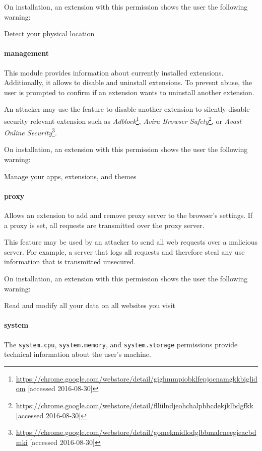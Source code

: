 	On installation, an extension with this permission shows the user the following warning:
	\begin{permissionwarning}
		Detect your physical location 
	\end{permissionwarning}
	
\paragraph{management}
	This module provides information about currently installed extensions. Additionally, it allows to disable and uninstall extensions. To prevent abuse, the user is prompted to confirm if an extension wants to uninstall another extension. 
	
	An attacker may use the feature to disable another extension to silently disable security relevant extension such as 
	\textit{Adblock}\footnote{\url{https://chrome.google.com/webstore/detail/gighmmpiobklfepjocnamgkkbiglidom} [accessed 2016-08-30]}, 
	\textit{Avira Browser Safety}\footnote{\url{https://chrome.google.com/webstore/detail/flliilndjeohchalpbbcdekjklbdgfkk} [accessed 2016-08-30]}, or 
	\textit{Avast Online Security}\footnote{\url{https://chrome.google.com/webstore/detail/gomekmidlodglbbmalcneegieacbdmki} [accessed 2016-08-30]}.
	
	On installation, an extension with this permission shows the user the following warning:
	\begin{permissionwarning}
		Manage your apps, extensions, and themes 
	\end{permissionwarning}
	
\paragraph{proxy}
	Allows an extension to add and remove proxy server to the browser's settings. If a proxy is set, all requests are transmitted over the proxy server.
	
	This feature may be used by an attacker to send all web requests over a malicious server. For example, a server that logs all requests and therefore steal any use information that is transmitted unsecured.
	
	On installation, an extension with this permission shows the user the following warning:
	\begin{permissionwarning}
		Read and modify all your data on all websites you visit 
	\end{permissionwarning}
	
\paragraph{system}
	The \texttt{system.cpu}, \texttt{system.memory}, and \texttt{system.storage} permissions provide technical information about the user's machine.
	
